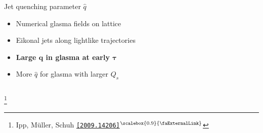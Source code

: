 \documentclass[aspectratio=169,11pt,usenames,dvipsnames]{beamer}
\renewcommand{\thefootnote}{\color{customblue}\faPaperPlaneO}
\newcommand\blfootnote[1]{%
  \begingroup
  \renewcommand\thefootnote{}\footnote{#1}%
  \addtocounter{footnote}{-1}%
  \endgroup
}
\begin{document}
\begin{frame}[t,noframenumbering]
\begin{columns}[onlytextwidth,t]
        \begin{center}
            {\Large\color{isgold} Jet quenching parameter $\hat{q}$\\[10pt]}
            \footnotesize
                \begin{itemize}
                    \item {\color{lightgray}Numerical glasma fields on lattice}
                    \item {\color{lightgray} Eikonal jets along lightlike trajectories}
                     \item {\color{lightgray}\bfseries Large $\boldsymbol{\hat{q}}$ in glasma at early $\boldsymbol{\tau}$}
                     \item {\color{lightgray}More $\hat{q}$ for glasma with larger $Q_s$}
                \end{itemize}
        \end{center}
    \end{columns}
    \blfootnote{\scriptsize Ipp, Müller, Schuh \href{https://arxiv.org/abs/2009.14206}{\color{palgold}\texttt{[2009.14206]}$^\text{\scalebox{0.9}{\faExternalLink}}$}}
\end{frame}

\end{document}

